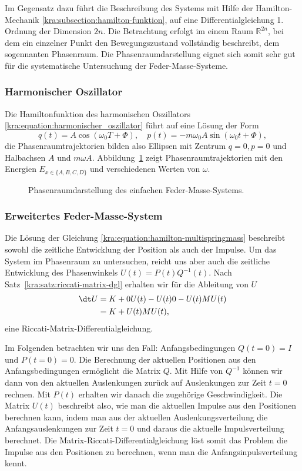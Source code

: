 Im Gegensatz dazu führt die Beschreibung des Systems mit Hilfe der Hamilton-Mechanik \ref{kra:subsection:hamilton-funktion}, auf eine Differentialgleichung 1. Ordnung der Dimension $2n$.
Die Betrachtung erfolgt im einem Raum $\mathbb{R}^{2n}$, bei dem ein einzelner Punkt den Bewegungszustand vollständig beschreibt, dem sogennanten Phasenraum.
Die Phasenraumdarstellung eignet sich somit sehr gut für die systematische Untersuchung der Feder-Masse-Systeme.

\subsubsection{Harmonischer Oszillator}
Die Hamiltonfunktion des harmonischen Oszillators \eqref{kra:equation:harmonischer_oszillator} führt auf eine Lösung der Form
\begin{equation*}
    q(t) = A \cos(\omega_0 T + \Phi), \quad p(t) = -m \omega_0 A \sin(\omega_0 t + \Phi),
\end{equation*}
die Phasenraumtrajektorien bilden also Ellipsen mit Zentrum $q=0, p=0$ und Halbachsen $A$ und $m \omega A$.
Abbildung~\ref{kra:fig:phasenraum} zeigt Phasenraumtrajektorien mit den Energien $E_{x \in \{A, B, C, D\}}$ und verschiedenen Werten von $\omega$.
\begin{figure}
    \centering
    
    \caption{Phasenraumdarstellung des einfachen Feder-Masse-Systems.}
    \label{kra:fig:phasenraum}
\end{figure}

\subsubsection{Erweitertes Feder-Masse-System}
Die Lösung der Gleichung \eqref{kra:equation:hamilton-multispringmass} beschreibt sowohl die zeitliche Entwicklung der Position als auch der Impulse.
Um das System im Phasenraum zu untersuchen, reicht uns aber auch die zeitliche Entwicklung des Phasenwinkels $U(t) = P(t)Q^{-1}(t)$.
Nach Satz~\ref{kra:satz:riccati-matrix-dgl} erhalten wir für die Ableitung von $U$
\begin{equation}
    \begin{split}
        \dt U   &= K  + 0U(t) - U(t)0 - U(t)MU(t) \\
        &= K + U(t)MU(t),
    \end{split}
\end{equation}
eine Riccati-Matrix-Differentialgleichung.

Im Folgenden betrachten wir uns den Fall: Anfangsbedingungen $Q(t=0)=I$ und $P(t=0)=0$.
Die Berechnung der aktuellen Positionen aus den Anfangsbedingungen ermöglicht die Matrix $Q$.
Mit Hilfe von $Q^{-1}$ können wir dann von den aktuellen Auslenkungen zurück auf Auslenkungen zur Zeit $t=0$ rechnen.
Mit $P(t)$ erhalten wir danach die zugehörige Geschwindigkeit.
Die Matrix $U(t)$ beschreibt also, wie man die aktuellen Impulse aus den Positionen berechnen kann, indem man aus der aktuellen Auslenkungsverteilung
die Anfangsauslenkungen zur Zeit $t=0$ und daraus die aktuelle Impulsverteilung berechnet.
Die Matrix-Riccati-Differentialgleichung löst somit das Problem die Impulse aus den Positionen zu berechnen, wenn man die Anfangsinpulsverteilung kennt.

